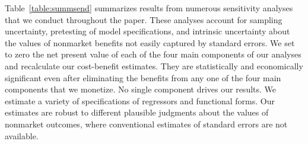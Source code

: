 Table~\ref{table:summsend} summarizes results from numerous sensitivity analyses that we conduct throughout the paper. These analyses account for sampling uncertainty, pretesting of model specifications, and intrinsic uncertainty about the values of nonmarket benefits not easily captured by standard errors. We set to zero the net present value of each of the four main components of our analyses and recalculate our cost-benefit estimates. They are statistically and economically significant even after eliminating the benefits from any one of the four main components that we monetize. No single component drives our results. We estimate a variety of specifications of regressors and functional forms. Our estimates are robust to different plausible judgments about the values of nonmarket outcomes, where conventional estimates of standard errors are not available.

